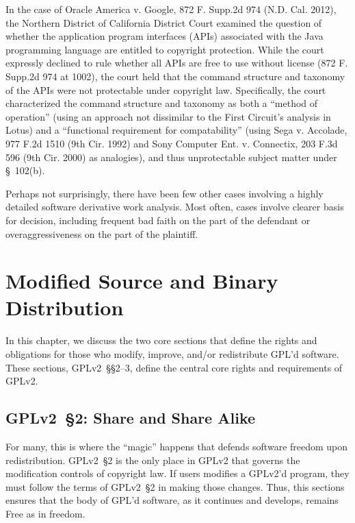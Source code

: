 In the case of Oracle America v. Google, 872 F. Supp.2d 974 (N.D. Cal. 2012),
the Northern District of California District Court examined the question of 
whether the application program interfaces (APIs) associated with the Java
programming language are entitled to copyright protection.  While the 
court expressly declined to rule whether all APIs are free to use without 
license (872 F. Supp.2d 974 at 1002), the court held that the command 
structure and taxonomy of the APIs were not protectable under copyright law.
Specifically, the court characterized the command structure and taxonomy as
both a ``method of operation'' (using an approach not dissimilar to the 
First Circuit's analysis in Lotus) and a ``functional requirement for 
compatability'' (using Sega v. Accolade, 977 F.2d 1510 (9th Cir. 1992) and
Sony Computer Ent. v. Connectix, 203 F.3d 596 (9th Cir. 2000) as analogies),
and thus unprotectable subject matter under \S~102(b). 

Perhaps not surprisingly, there have been few other cases involving a highly
detailed software derivative work analysis. Most often, cases involve
clearer basis for decision, including frequent bad faith on the part of
the defendant or overaggressiveness on the part of the plaintiff.  


\chapter{Modified Source and Binary Distribution}
\label{source-and-binary}

In this chapter, we discuss the two core sections that define the rights
and obligations for those who modify, improve, and/or redistribute GPL'd
software. These sections, GPLv2~\S\S2--3, define the central core rights and
requirements of GPLv2\@.

\section{GPLv2~\S2: Share and Share Alike}
\label{GPLv2s2}

For many, this is where the ``magic'' happens that defends software
freedom upon redistribution.  GPLv2~\S2 is the only place in GPLv2
that governs the modification controls of copyright law.  If users
modifies a GPLv2'd program, they must follow the terms of GPLv2~\S2 in making
those changes.  Thus, this sections ensures that the body of GPL'd software, as it
continues and develops, remains Free as in freedom.

